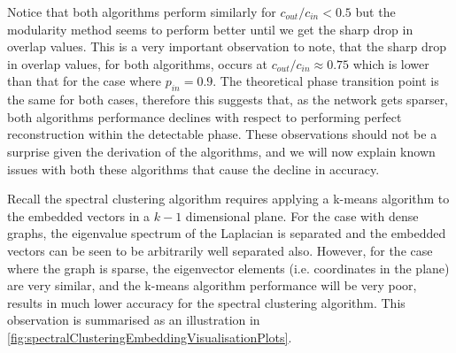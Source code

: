 Notice that both algorithms perform similarly for $c_{out}/c_{in} < 0.5$ but the modularity method seems to perform better until we get the sharp drop in overlap values.
This is a very important observation to note, that the sharp drop in overlap values, for both algorithms, occurs at $c_{out}/c_{in} \approx 0.75$ which is lower than that for the case where $p_{in}=0.9$.
The theoretical phase transition point is the same for both cases, therefore this suggests that, as the network gets sparser, both algorithms performance declines with respect to performing perfect reconstruction within the detectable phase.
These observations should not be a surprise given the derivation of the algorithms, and we will now explain known issues with both these algorithms that cause the decline in accuracy.

Recall the spectral clustering algorithm requires applying a k-means algorithm to the embedded vectors in a $k-1$ dimensional plane.
For the case with dense graphs, the eigenvalue spectrum of the Laplacian is separated and the embedded vectors can be seen to be arbitrarily well separated also.
However, for the case where the graph is sparse, the eigenvector elements (i.e. coordinates in the plane) are very similar, and the k-means algorithm performance will be very poor, results in much lower accuracy for the spectral clustering algorithm.
This observation is summarised as an illustration in \cref{fig:spectralClusteringEmbeddingVisualisationPlots}.

